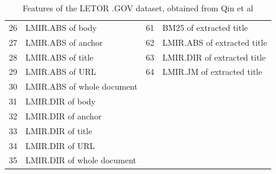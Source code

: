 \begin{table}[!h]
{\begin{tabular}{p{0.29cm}|p{7.26cm}||p{0.29cm}|p{9.55cm}}
26& LMIR.ABS\cite{Zhai2001} of body	& 61& BM25 of extracted title\\
27& LMIR.ABS of anchor				& 62& LMIR.ABS of extracted title\\
28& LMIR.ABS of title				& 63& LMIR.DIR of extracted title\\
29& LMIR.ABS of \ac{URL}			& 64& LMIR.JM of extracted title\\
30& LMIR.ABS of whole document\\

31& LMIR.DIR of body\\
32& LMIR.DIR of anchor\\
33& LMIR.DIR of title\\
34& LMIR.DIR of \ac{URL}\\
35& LMIR.DIR of whole document\\
\end{tabular}
}
\caption{Features of the LETOR .GOV dataset, obtained from Qin et al\cite{Qin2010}}
\label{tbl:features_gov}
\end{table}

